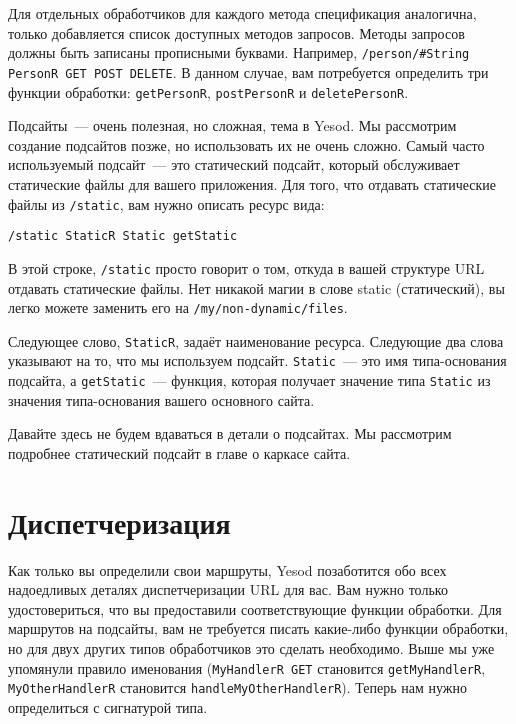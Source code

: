 Для отдельных обработчиков для каждого метода спецификация аналогична,
только добавляется список доступных методов запросов. Методы запросов
должны быть записаны прописными буквами. Например,
\lstinline!/person/#String PersonR GET POST DELETE!.
В данном случае, вам потребуется определить три функции обработки:
\lstinline!getPersonR!, \lstinline!postPersonR! и \lstinline!deletePersonR!.

Подсайты~--- очень полезная, но сложная, тема в Yesod. Мы рассмотрим
создание подсайтов позже, но использовать их не очень сложно. Самый
часто используемый подсайт~--- это статический подсайт, который
обслуживает статические файлы для вашего приложения. Для того, что
отдавать статические файлы из \lstinline!/static!, вам нужно описать
ресурс вида:
\begin{verbatim}
/static StaticR Static getStatic
\end{verbatim}

В этой строке, \lstinline!/static! просто говорит о том, откуда в вашей
структуре URL отдавать статические файлы. Нет никакой магии в слове
static (статический), вы легко можете заменить его на
\lstinline!/my/non-dynamic/files!.

Следующее слово, \lstinline!StaticR!, задаёт наименование
ресурса. Следующие два слова указывают на то, что мы используем
подсайт. \lstinline!Static!~--- это имя типа-основания подсайта, а
\lstinline!getStatic!~--- функция, которая получает значение типа
\lstinline!Static! из значения типа-основания вашего основного сайта.

Давайте здесь не будем вдаваться в детали о подсайтах. Мы рассмотрим
подробнее статический подсайт в главе о каркасе
сайта.

\section{Диспетчеризация}
Как только вы определили свои маршруты, Yesod позаботится обо всех
надоедливых деталях диспетчеризации URL для вас. Вам нужно только
удостовериться, что вы предоставили соответствующие функции
обработки. Для маршрутов на подсайты, вам не требуется писать
какие-либо функции обработки, но для двух других типов обработчиков
это сделать необходимо. Выше мы уже упомянули правило именования
(\lstinline!MyHandlerR GET! становится \lstinline!getMyHandlerR!,
\lstinline!MyOtherHandlerR! становится \lstinline!handleMyOtherHandlerR!).
Теперь нам нужно определиться с сигнатурой типа.

